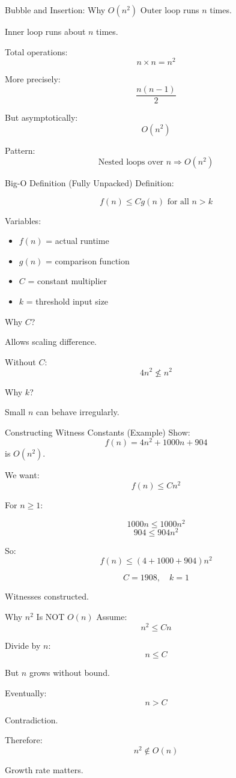 \documentclass[aspectratio=169]{beamer}
\begin{document}
\begin{frame}{Bubble and Insertion: Why $O(n^2)$}
Outer loop runs $n$ times.

Inner loop runs about $n$ times.

Total operations:
\[
n \times n = n^2
\]

More precisely:
\[
\frac{n(n-1)}{2}
\]

But asymptotically:
\[
O(n^2)
\]

Pattern:
\[
\text{Nested loops over } n \Rightarrow O(n^2)
\]
\end{frame}

\begin{frame}{Big-O Definition (Fully Unpacked)}
Definition:

\[
f(n) \le C g(n) \text{ for all } n>k
\]

Variables:

\begin{itemize}
\item $f(n)$ = actual runtime
\item $g(n)$ = comparison function
\item $C$ = constant multiplier
\item $k$ = threshold input size
\end{itemize}

Why $C$?

Allows scaling difference.

Without $C$:
\[
4n^2 \not\le n^2
\]

Why $k$?

Small $n$ can behave irregularly.
\end{frame}

\begin{frame}{Constructing Witness Constants (Example)}
Show:
\[
f(n) = 4n^2 + 1000n + 904
\]
is $O(n^2)$.

We want:
\[
f(n) \le C n^2
\]

For $n \ge 1$:

\[
1000n \le 1000n^2
\]
\[
904 \le 904n^2
\]

So:
\[
f(n) \le (4+1000+904)n^2
\]

\[
C=1908,\quad k=1
\]

Witnesses constructed.
\end{frame}

\begin{frame}{Why $n^2$ Is NOT $O(n)$}
Assume:
\[
n^2 \le Cn
\]

Divide by $n$:
\[
n \le C
\]

But $n$ grows without bound.

Eventually:
\[
n > C
\]

Contradiction.

Therefore:
\[
n^2 \notin O(n)
\]

Growth rate matters.
\end{frame}
\end{document}
